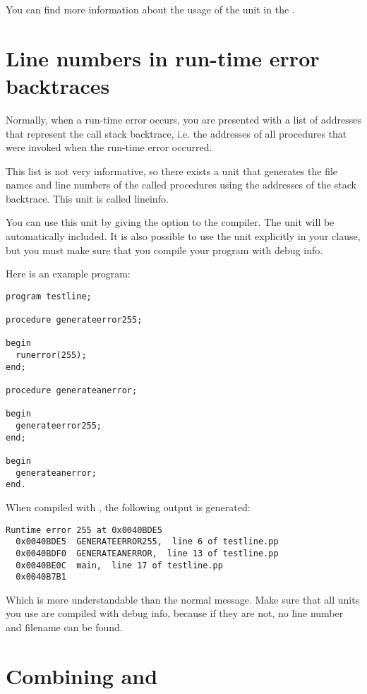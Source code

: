 \documentclass{report}
\begin{document}
You can find more information about the usage of the  unit
in the \unitsref.

\section{Line numbers in run-time error backtraces}
\label{se:lineinfo}

Normally, when a run-time error occurs, you are presented with a list
of addresses that represent the call stack backtrace, i.e. the addresses
of all procedures that were invoked when the run-time error occurred.

This list is not very informative, so there exists a unit that generates
the file names and line numbers of the called procedures using the
addresses of the stack backtrace. This unit is called lineinfo.

You can use this unit by giving the  option to the compiler. The
unit will be automatically included. It is also possible to use the unit
explicitly in your  clause, but you must make sure that you
compile your program with debug info.

Here is an example program:
\begin{verbatim}
program testline;

procedure generateerror255;

begin
  runerror(255);
end;

procedure generateanerror;

begin
  generateerror255;
end;

begin
  generateanerror;
end.
\end{verbatim}
When compiled with , the following output is generated:
\begin{verbatim}
Runtime error 255 at 0x0040BDE5
  0x0040BDE5  GENERATEERROR255,  line 6 of testline.pp
  0x0040BDF0  GENERATEANERROR,  line 13 of testline.pp
  0x0040BE0C  main,  line 17 of testline.pp
  0x0040B7B1
\end{verbatim}
Which is more understandable than the normal message. Make sure that all
units you use are compiled with debug info, because if they are not, no
line number and filename can be found.

\section{Combining  and }
\end{document}

